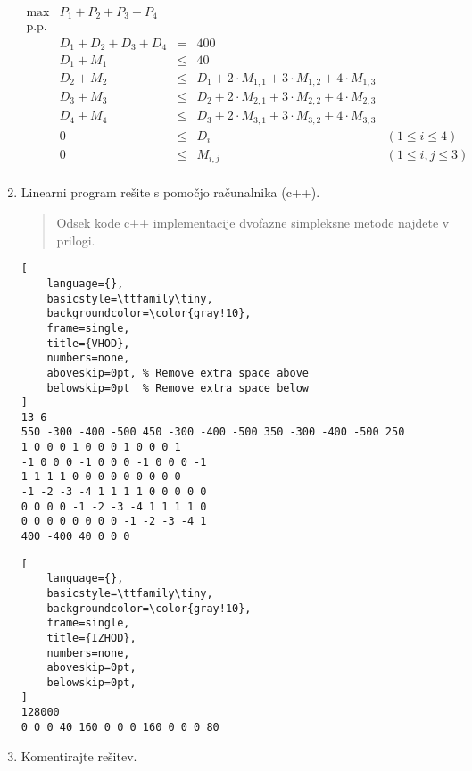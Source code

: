 \documentclass{article}
\begin{document}
\begin{enumerate}[label=\alph*)]
    $$
    \begin{array}{rrlll}
        \text{max} & P_1 + P_2 + P_3 + P_4 \\
        \text{p.p.} \\
        & D_1+D_2+D_3+D_4 & = & 400\\
        & D_1+M_1 & \leq & 40\\
        & D_2+M_2 & \leq & D_1 + 2 \cdot M_{1,1} + 3 \cdot M_{1,2} + 4 \cdot M_{1,3}\\
        & D_3+M_3 & \leq & D_2 + 2 \cdot M_{2,1} + 3 \cdot M_{2,2} + 4 \cdot M_{2,3}\\
        & D_4+M_4 & \leq & D_3 + 2 \cdot M_{3,1} + 3 \cdot M_{3,2} + 4 \cdot M_{3,3}\\
        & 0 & \leq & D_i & (1 \leq i \leq 4) \\
        & 0 & \leq & M_{i,j} & (1 \leq i,j \leq 3) \\
    \end{array}
    $$
\item Linearni program rešite s pomočjo računalnika (c++).
\begin{quote} 
    Odsek kode c++ implementacije dvofazne simpleksne metode najdete v prilogi.
\end{quote}
\begin{center}
\begin{minipage}[t][4.5cm][t]{0.45\textwidth} %
\vspace{0pt} %
\begin{lstlisting}[
    language={}, 
    basicstyle=\ttfamily\tiny, 
    backgroundcolor=\color{gray!10}, 
    frame=single, 
    title={VHOD},
    numbers=none,
    aboveskip=0pt, % Remove extra space above
    belowskip=0pt  % Remove extra space below
]
13 6
550 -300 -400 -500 450 -300 -400 -500 350 -300 -400 -500 250
1 0 0 0 1 0 0 0 1 0 0 0 1
-1 0 0 0 -1 0 0 0 -1 0 0 0 -1
1 1 1 1 0 0 0 0 0 0 0 0 0
-1 -2 -3 -4 1 1 1 1 0 0 0 0 0
0 0 0 0 -1 -2 -3 -4 1 1 1 1 0
0 0 0 0 0 0 0 0 -1 -2 -3 -4 1
400 -400 40 0 0 0
\end{lstlisting}
\end{minipage}
\hfill
\begin{minipage}[t][4.5cm][t]{0.45\textwidth} %
\vspace{0pt} %
\begin{lstlisting}[
    language={}, 
    basicstyle=\ttfamily\tiny, 
    backgroundcolor=\color{gray!10}, 
    frame=single, 
    title={IZHOD},
    numbers=none,
    aboveskip=0pt,
    belowskip=0pt,
]
128000
0 0 0 40 160 0 0 0 160 0 0 0 80 
\end{lstlisting}
\end{minipage}
\end{center}
\item Komentirajte rešitev.
    

\end{enumerate}
\end{document}
